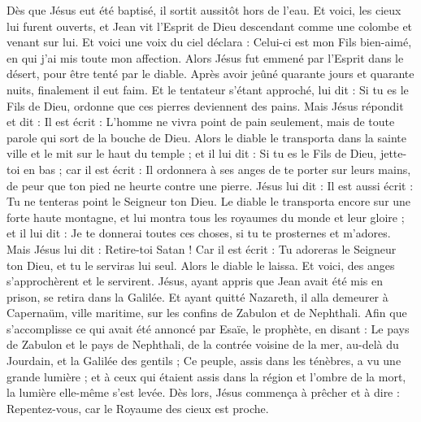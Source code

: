 \begin{multicols}{2}
Dès que Jésus eut été baptisé, il sortit aussitôt hors de l'eau. Et voici, les cieux lui furent ouverts, et Jean vit l'Esprit de Dieu descendant comme une colombe et venant sur lui.
Et voici une voix du ciel déclara : Celui-ci est mon Fils bien-aimé, en qui j'ai mis toute mon affection.
\VerseOne{}Alors Jésus fut emmené par l'Esprit dans le désert, pour être tenté par le diable.
Après avoir jeûné quarante jours et quarante nuits, finalement il eut faim.
Et le tentateur s’étant approché, lui dit : Si tu es le Fils de Dieu, ordonne que ces pierres deviennent des pains.
Mais Jésus répondit et dit : Il est écrit : L'homme ne vivra point de pain seulement, mais de toute parole qui sort de la bouche de Dieu{}.
Alors le diable le transporta dans la sainte ville et le mit sur le haut du temple ;
et il lui dit : Si tu es le Fils de Dieu, jette-toi en bas ; car il est écrit : Il ordonnera à ses anges de te porter sur leurs mains, de peur que ton pied ne heurte contre une pierre{}.
Jésus lui dit : Il est aussi écrit : Tu ne tenteras point le Seigneur ton Dieu{}.
Le diable le transporta encore sur une forte haute montagne, et lui montra tous les royaumes du monde et leur gloire ;
et il lui dit : Je te donnerai toutes ces choses, si tu te prosternes et m'adores.
Mais Jésus lui dit : Retire-toi Satan ! Car il est écrit : Tu adoreras le Seigneur ton Dieu, et tu le serviras lui seul{}.
Alors le diable le laissa. Et voici, des anges s'approchèrent et le servirent.
Jésus, ayant appris que Jean avait été mis en prison, se retira dans la Galilée.
Et ayant quitté Nazareth, il alla demeurer à Capernaüm, ville maritime, sur les confins de Zabulon et de Nephthali.
Afin que s’accomplisse ce qui avait été annoncé par Esaïe, le prophète, en disant :
Le pays de Zabulon et le pays de Nephthali, de la contrée voisine de la mer, au-delà du Jourdain, et la Galilée des gentils ;
Ce peuple, assis dans les ténèbres, a vu une grande lumière ; et à ceux qui étaient assis dans la région et l'ombre de la mort, la lumière elle-même s'est levée{}.
Dès lors, Jésus commença à prêcher et à dire : Repentez-vous, car le Royaume des cieux est proche.

\end{multicols}

